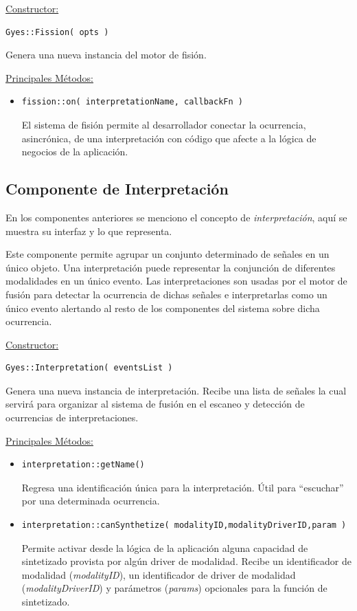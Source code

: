 \underline{\textsf{Constructor:}}
\begin{lstlisting}
Gyes::Fission( opts )
\end{lstlisting}
Genera una nueva instancia del motor de fisión.


\underline{\textsf{Principales Métodos:}}
\begin{itemize}
\item[]
\begin{lstlisting}
fission::on( interpretationName, callbackFn )
\end{lstlisting}
El sistema de fisión permite al desarrollador conectar la ocurrencia, asincrónica, de una interpretación con código que afecte a la lógica de negocios de la aplicación.
\end{itemize}

\subsection{Componente de Interpretación}

En los componentes anteriores se menciono el concepto de \emph{interpretación}, aquí se muestra su interfaz y lo que representa.

Este componente permite agrupar un conjunto determinado de señales en un único objeto.
Una interpretación puede representar la conjunción de diferentes modalidades en un único evento.
Las interpretaciones son usadas por el motor de fusión para detectar la ocurrencia de dichas señales e interpretarlas como un único evento alertando al resto de los componentes del sistema sobre dicha ocurrencia.


\underline{\textsf{Constructor:}}
\begin{lstlisting}
Gyes::Interpretation( eventsList )
\end{lstlisting}
Genera una nueva instancia de interpretación. Recibe una lista de señales la cual servirá para organizar al sistema de fusión en el escaneo y detección de ocurrencias de interpretaciones.


\underline{\textsf{Principales Métodos:}}
\begin{itemize}
\item[]
\begin{lstlisting}
interpretation::getName()
\end{lstlisting}
Regresa una identificación única para la interpretación. Útil para ``escuchar'' por una determinada ocurrencia.

\item[]
\begin{lstlisting}
interpretation::canSynthetize( modalityID,modalityDriverID,param )
\end{lstlisting}
Permite activar desde la lógica de la aplicación alguna capacidad de sintetizado provista por algún driver de modalidad. Recibe un identificador de modalidad (\emph{modalityID}), un identificador de driver de modalidad (\emph{modalityDriverID}) y parámetros (\emph{params}) opcionales para la función de sintetizado.

\end{itemize}

